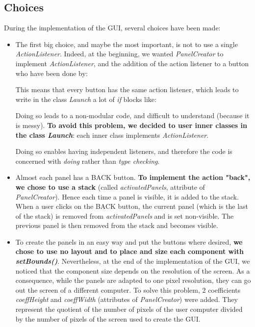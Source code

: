 \subsection{Choices}
\label{sub:choices}
During the implementation of the GUI, several choices have been made:
\begin{itemize}
	\item The first big choice, and maybe the most important, is not to use a single \textit{ActionListener}. Indeed, at the beginning, we wanted \textit{PanelCreator} to implement \textit{ActionListener}, and the addition of the action listener to a button who have been done by:

This means that every button has the same action listener, which leads to write in the class \textit{Launch} a lot of \textit{if} blocks like:

Doing so leads to a non-modular code, and difficult to understand (because it is messy). \textbf{To avoid this problem, we decided to user inner classes in the class \textit{Launch}}: each inner class implements \textit{ActionListener}.

Doing so enables having independent listeners, and therefore the code is concerned with \textit{doing} rather than \textit{type checking}.

	\item Almost each panel has a BACK button. \textbf{To implement the action "back", we chose to use a stack} (called \textit{activatedPanels}, attribute of \textit{PanelCreator}). Hence each time a panel is visible, it is added to the stack. When a user clicks on the BACK button, the current panel (which is the last of the stack) is removed from \textit{activatedPanels} and is set non-visible. The previous panel is then removed from the stack and becomes visible.
	
	\item To create the panels in an easy way and put the buttons where desired, \textbf{we chose to use no layout and to place and size each component with \textit{setBounds()}}. Nevertheless, at the end of the implementation of the GUI, we noticed that the component size depends on the resolution of the screen. As a consequence, while the panels are adapted to one pixel resolution, they can go out the screen of a different computer. To solve this problem, 2 coefficients \textit{coeffHeight} and \textit{coeffWidth} (attributes of \textit{PanelCreator}) were added. They represent the quotient of the number of pixels of the user computer divided by the number of pixels of the screen used to create the GUI.
	

\end{itemize}
